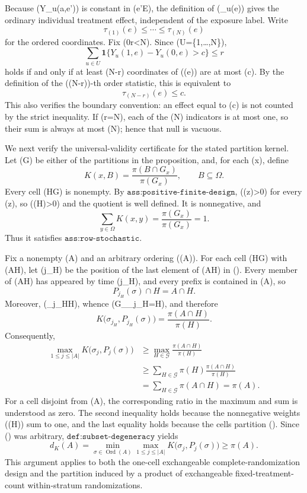 Because (Y_u(a,e')) is constant in (e'\in\mathcal E), the definition of (\tau_u(e)) gives the ordinary individual treatment effect, independent of the exposure label.  Write
\[
 \tau_{(1)}(e)\leq\cdots\leq\tau_{(N)}(e)
\]
for the ordered coordinates.  Fix (0\leq r<N).  Since (U=\{1,\ldots,N\}),
\[
 \sum_{u\in U}\mathbf 1\{Y_u(1,e)-Y_u(0,e)>c\}\leq r
\]
holds if and only if at least (N-r) coordinates of (\tau(e)) are at most (c).  By the definition of the ((N-r))-th order statistic, this is equivalent to
\[
 \tau_{(N-r)}(e)\leq c.
\]
This also verifies the boundary convention: an effect equal to (c) is not counted by the strict inequality.  If (r=N), each of the (N) indicators is at most one, so their sum is always at most (N); hence that null is vacuous.

We next verify the universal-validity certificate for the stated partition kernel.  Let (\mathcal G) be either of the partitions in the proposition, and, for each (x\in\Omega), define
\[
 K(x,B)=\frac{\pi(B\cap G_x)}{\pi(G_x)},\qquad B\subseteq\Omega.
\]
Every cell (H\in\mathcal G) is nonempty.  By \(\texttt{ass:positive-finite-design}\), (\pi(z)>0) for every (z\in\Omega), so (\pi(H)>0) and the quotient is well defined.  It is nonnegative, and
\[
 \sum_{y\in\Omega}K(x,y)
 =\frac{\pi(G_x)}{\pi(G_x)}=1.
\]
Thus it satisfies \(\texttt{ass:row-stochastic}\).

Fix a nonempty (A\subseteq\Omega) and an arbitrary ordering (\sigma\in{}(A)).  For each cell (H\in\mathcal G) with (A\cap H\neq\varnothing), let (j_H) be the position of the last element of (A\cap H) in (\sigma).  Every member of (A\cap H) has appeared by time (j_H), and every prefix is contained in (A), so
\[
 P_{j_H}(\sigma)\cap H=A\cap H.
\]
Moreover, (\sigma_{j_H}\in H), whence (G_{\sigma_{j_H}}=H), and therefore
\[
 K\bigl(\sigma_{j_H},P_{j_H}(\sigma)\bigr)
 =\frac{\pi(A\cap H)}{\pi(H)}.
\]
Consequently,
\[
 \begin{aligned}
 \max_{1\leq j\leq |A|}K\bigl(\sigma_j,P_j(\sigma)\bigr)
 &\geq \max_{H\in\mathcal G}\frac{\pi(A\cap H)}{\pi(H)}\\
 &\geq \sum_{H\in\mathcal G}\pi(H)
       \frac{\pi(A\cap H)}{\pi(H)}\\
 &=\sum_{H\in\mathcal G}\pi(A\cap H)
 =\pi(A).
 \end{aligned}
\]
For a cell disjoint from (A), the corresponding ratio in the maximum and sum is understood as zero.  The second inequality holds because the nonnegative weights (\pi(H)) sum to one, and the last equality holds because the cells partition (\Omega).  Since (\sigma) was arbitrary, \(\texttt{def:subset-degeneracy}\) yields
\[
 d_K(A)=\min_{\sigma\in\operatorname{Ord}(A)}
       \max_{1\leq j\leq |A|}K\bigl(\sigma_j,P_j(\sigma)\bigr)
 \geq\pi(A).
\]
This argument applies to both the one-cell exchangeable complete-randomization design and the partition induced by a product of exchangeable fixed-treatment-count within-stratum randomizations.

